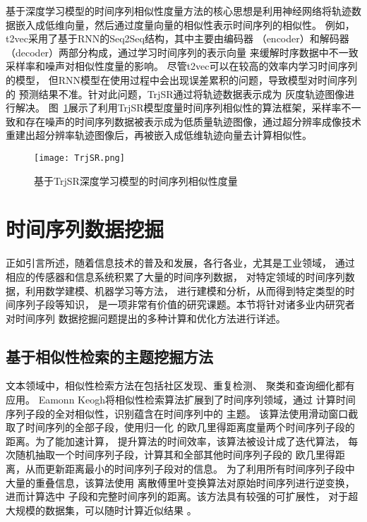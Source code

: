 基于深度学习模型的时间序列相似性度量方法的核心思想是利用神经网络将轨迹数据嵌入成低维向量，然后通过度量向量的相似性表示时间序列的相似性。
例如，t2vec采用了基于RNN的Seq2Seq结构，其中主要由编码器
（encoder）和解码器（decoder）两部分构成，通过学习时间序列的表示向量
来缓解时序数据中不一致采样率和噪声对相似性度量的影响\cite{DBLP:conf/icde/LiZCJW18}。
尽管t2vec可以在较高的效率内学习时间序列的模型，
但RNN模型在使用过程中会出现误差累积的问题，导致模型对时间序列的
预测结果不准。针对此问题，TrjSR通过将轨迹数据表示成为
灰度轨迹图像进行解决\cite{DBLP:conf/ijcnn/CaoTWWX21}。
图~\ref{fig:TrjSR}展示了利用TrjSR模型度量时间序列相似性的算法框架，采样率不一致和存在噪声的时间序列数据被表示成为低质量轨迹图像，通过超分辨率成像技术重建出超分辨率轨迹图像后，再被嵌入成低维轨迹向量去计算相似性。
\begin{figure}
  \centering
  \texttt{[image: TrjSR.png]}
  \caption{基于TrjSR深度学习模型的时间序列相似性度量}
  \label{fig:TrjSR}
\end{figure}

\section{时间序列数据挖掘}
正如引言所述，随着信息技术的普及和发展，各行各业，尤其是工业领域，
通过相应的传感器和信息系统积累了大量的时间序列数据，
对特定领域的时间序列数据，利用数学建模、机器学习等方法，
进行建模和分析，从而得到特定类型的时间序列子段等知识，
是一项非常有价值的研究课题。本节将针对诸多业内研究者对时间序列
数据挖掘问题提出的多种计算和优化方法进行详述。

\subsection{基于相似性检索的主题挖掘方法}
文本领域中，相似性检索方法在包括社区发现、重复检测、
聚类和查询细化都有应用\cite{DBLP:conf/www/BayardoMS07}。
Eamonn Keogh将相似性检索算法扩展到了时间序列领域，通过
计算时间序列子段的全对相似性，识别蕴含在时间序列中的
主题\cite{DBLP:conf/kdd/RakthanmanonCMBWZZK12}。
该算法使用滑动窗口截取了时间序列的全部子段，使用归一化
的欧几里得距离度量两个时间序列子段的距离。为了能加速计算，
提升算法的时间效率，该算法被设计成了迭代算法，
每次随机抽取一个时间序列子段，计算其和全部其他时间序列子段的
欧几里得距离，从而更新距离最小的时间序列子段对的信息。
为了利用所有时间序列子段中大量的重叠信息，该算法使用
离散傅里叶变换算法对原始时间序列进行逆变换，进而计算选中
子段和完整时间序列的距离。该方法具有较强的可扩展性，
对于超大规模的数据集，可以随时计算近似结果
\cite{DBLP:conf/icdm/ZhuZSYFMBK16}。

